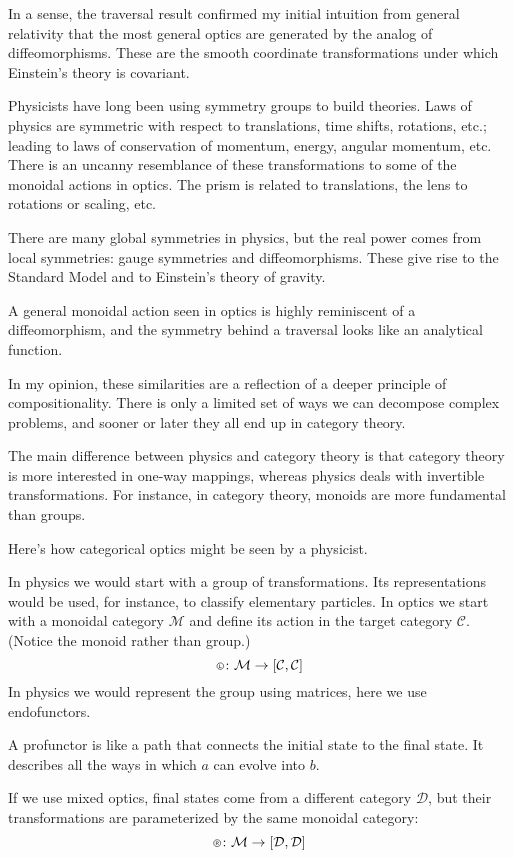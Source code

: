 \documentclass[11pt]{amsart}
\newcommand*\circled[3]
  {\tikz[baseline={([yshift=#2]current bounding box.center)}]{
      \node[shape=circle,draw,inner sep=#1] (char) {#3};}}
\newcommand{\actL}{\mathbin{\circled{0.5pt}{-0.55ex}{\scalebox{0.75}{\tiny{$\mathsf{L}$}}}}}
\newcommand{\actR}{\mathbin{\circled{0.5pt}{-0.55ex}{\scalebox{0.75}{\tiny{$\mathsf{R}$}}}}}
\begin{document}
In a sense, the traversal result confirmed my initial intuition from general relativity that the most general optics are generated by the analog of diffeomorphisms. These are the smooth coordinate transformations under which Einstein's theory is covariant. 

Physicists have long been using symmetry groups to build theories. Laws of physics are symmetric with respect to translations, time shifts, rotations, etc.; leading to laws of conservation of momentum, energy, angular momentum, etc. There is an uncanny resemblance of these transformations to some of the monoidal actions in optics. The prism is related to translations, the lens to rotations or scaling, etc.

There are many global symmetries in physics, but the real power comes from local symmetries: gauge symmetries and diffeomorphisms. These give rise to the Standard Model and to Einstein's theory of gravity. 

A general monoidal action seen in optics is highly reminiscent of a diffeomorphism, and the symmetry behind a traversal looks like an analytical function.

In my opinion, these similarities are a reflection of a deeper principle of compositionality. There is only a limited set of ways we can decompose complex problems, and sooner or later they all end up in category theory. 

The main difference between physics and category theory is that category theory is more interested in one-way mappings, whereas physics deals with invertible transformations. For instance, in category theory, monoids are more fundamental than groups.

Here's how categorical optics might be seen by a physicist. 

In physics we would start with a group of transformations. Its representations would be used, for instance, to classify elementary particles. In optics we start with a monoidal category $\mathcal{M}$ and define its action in the target category $\mathcal{C}$. (Notice the monoid rather than group.) 
\[ \actL \colon \mathcal{M} \to [\mathcal{C}, \mathcal{C}] \]
In physics we would represent the group using matrices, here we use endofunctors.

A profunctor is like a path that connects the initial state to the final state. It describes all the ways in which $a$ can evolve into $b$. 

If we use mixed optics, final states come from a different category $\mathcal{D}$, but their transformations are parameterized by the same monoidal category:
\[ \actR \colon \mathcal{M} \to [\mathcal{D}, \mathcal{D}] \]
\end{document}
